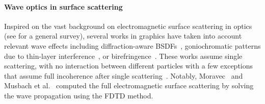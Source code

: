 \paragraph{Wave optics in surface scattering} 
Inspired on the vast background on electromagnetic surface scattering in optics (see \cite{frisvad2020survey} for a general survey), several works in graphics have taken into account relevant wave effects including diffraction-aware BSDFs~\cite{he1991comprehensive,Stam:1999:DiffractionShaders,Cuypers:2012:Diffraction,dong2015predicting,Holzschuch:2017:Two, Toisoul:2017:practical, Werner:2017:ScratchIridescence,Yan:2018:WavesMicrogeometry},  goniochromatic patterns due to thin-layer interference~\cite{Smits:1992:Newton,Gondek:1994:WavelengthDependent,Belcour:2017:Iridescence,guillen2020general}, or birefringence~\cite{Steinberg:2019:Analytic}. These works assume single scattering, with no interaction between different particles with a few exceptions that assume full incoherence after single scattering~\cite{Falster:2020:Computing,guillen2020general}. Notably, Moravec~ and Musbach et al.~ computed the full electromagnetic surface scattering by solving the wave propagation using the FDTD method. 
%
